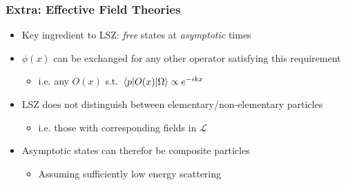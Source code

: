 \documentclass{beamer}
\begin{document}
\begin{frame}
\frametitle{Extra: Effective Field Theories}
\begin{itemize}
    \item<2-> Key ingredient to LSZ: \textit{free} states at \textit{asymptotic} times
    \item<3-> $\phi(x)$ can be exchanged for any other operator satisfying this requirement
    \begin{itemize}
        \item<4-> i.e. any $O(x)$ s.t. $\mel{p}{O(x)}{\Omega} \propto e^{-ikx}$
    \end{itemize}
    \item<5-> LSZ does not distinguish between elementary/non-elementary particles
    \begin{itemize}
        \item<6-> i.e. those with corresponding fields in $\mathscr{L}$
    \end{itemize}
    \item<7-> Asymptotic states can therefor be composite particles
    \begin{itemize}
        \item<8-> Assuming sufficiently low energy scattering
    \end{itemize}
\end{itemize}
\end{frame}
\end{document}
